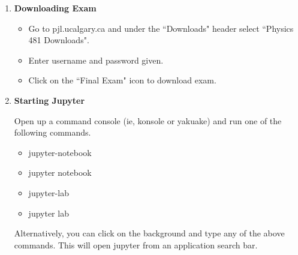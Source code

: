\documentclass{../../../assets/LabArx-Dev} 	%
\begin{document}



\maketitle

 
\begin{enumerate}

\item {\bf Downloading Exam}
\begin{itemize}
	\item Go to pjl.ucalgary.ca and under the ``Downloads" header select ``Physics 481 Downloads".
	\item Enter username and password given.
	\item Click on the ``Final Exam" icon to download exam.
\end{itemize}

\item {\bf Starting Jupyter}
	
	Open up a command console (ie, konsole or yakuake) and run one 		of the following commands.
	\begin {itemize}
		\item jupyter-notebook
		\item jupyter notebook
		\item jupyter-lab
		\item jupyter lab
	\end{itemize}
	Alternatively, you can click on the background and type any of the above commands. This will open jupyter from an application search bar.  


\end{enumerate}
\end{document}
